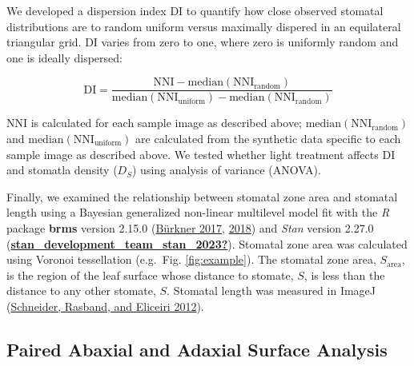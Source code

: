 \documentclass[12pt,halfline,a4paper,]{ouparticle}
\begin{document}
We developed a dispersion index \(\mathrm{DI}\) to quantify how close
observed stomatal distributions are to random uniform versus maximally
dispered in an equilateral triangular grid. \(\mathrm{DI}\) varies from
zero to one, where zero is uniformly random and one is ideally
dispersed:

\begin{equation}\label{eq:disp}
  \mathrm{DI} = \frac{\mathrm{NNI} - \text{median}(\mathrm{NNI_{random}})}{\text{median}(\mathrm{NNI_{uniform}}) - \text{median}(\mathrm{NNI_{random}})}
\end{equation}

\noindent \(\mathrm{NNI}\) is calculated for each sample image as
described above; \(\text{median}(\mathrm{NNI_{random}})\) and
\(\text{median}(\mathrm{NNI_{uniform}})\) are calculated from the
synthetic data specific to each sample image as described above. We
tested whether light treatment affects \(\mathrm{DI}\) and stomatla
density (\(D_S\)) using analysis of variance (ANOVA).

Finally, we examined the relationship between stomatal zone area and
stomatal length using a Bayesian generalized non-linear multilevel model
fit with the \emph{R} package \textbf{brms} version 2.15.0
(\protect\hyperlink{ref-burkner_brms_2017}{Bürkner 2017},
\protect\hyperlink{ref-burkner_advanced_2018}{2018}) and \emph{Stan}
version 2.27.0
(\protect\hyperlink{ref-stan_development_team_stan_2023}{\textbf{stan\_development\_team\_stan\_2023?}}).
Stomatal zone area was calculated using Voronoi tessellation (e.g.~Fig.
\ref{fig:example}). The stomatal zone area, \(S_\text{area}\), is the
region of the leaf surface whose distance to stomate, \(S\), is less
than the distance to any other stomate, \(S\). Stomatal length was
measured in ImageJ
(\protect\hyperlink{ref-schneider_nih_2012}{Schneider, Rasband, and
Eliceiri 2012}).

\hypertarget{paired-abaxial-and-adaxial-surface-analysis}{%
\subsection{Paired Abaxial and Adaxial Surface
Analysis}\label{paired-abaxial-and-adaxial-surface-analysis}}
\end{document}
